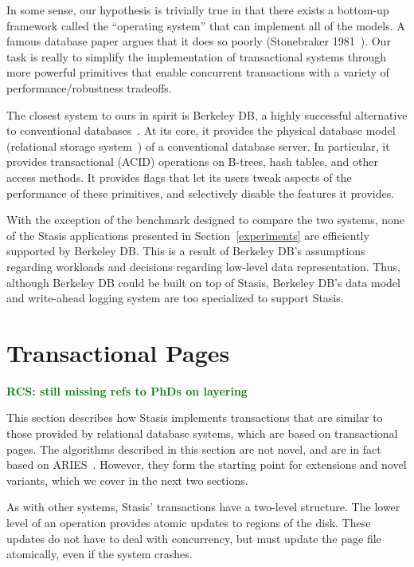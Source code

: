 \documentclass[letterpaper,twocolumn,10pt]{article}
\newcommand{\yad}{Stasis\xspace}
\newcommand{\yads}{Stasis'\xspace}
\newcommand{\rcs}[1]{\textcolor{green}{\bf RCS: #1}}
\begin{document}
In some sense, our hypothesis is trivially true in that there exists a
bottom-up framework called the ``operating system'' that can implement
all of the models. A famous database paper argues that it does so
poorly (Stonebraker 1981~\cite{Stonebraker81}). Our task is really to
simplify the implementation of transactional systems through more
powerful primitives that enable concurrent transactions with a variety
of performance/robustness tradeoffs.

The closest system to ours in spirit is Berkeley DB,  a highly successful alternative to conventional
databases~\cite{libtp}.  At its core, it provides the physical database model
(relational storage system~\cite{systemR}) of a conventional database server.
In particular, 
it provides transactional (ACID) operations on B-trees, 
hash tables, and other access methods.  It provides flags that 
let its users tweak aspects of the performance of these
primitives, and selectively disable the features it provides.

With the exception of the benchmark designed to compare the two
systems, none of the \yad applications presented in
Section~\ref{experiments} are efficiently supported by Berkeley DB.
This is a result of Berkeley DB's assumptions regarding workloads and
decisions regarding low-level data representation.  Thus, although
Berkeley DB could be built on top of \yad, Berkeley DB's data model
and write-ahead logging system are too specialized to support \yad.




\section{Transactional Pages}

\rcs{still missing refs to PhDs on layering}

This section describes how \yad implements transactions that are
similar to those provided by relational database systems, which are
based on transactional pages.  The algorithms described in this
section are not novel, and are in fact based on
ARIES~\cite{aries}.  However, they form the starting point for
extensions and novel variants, which we cover in the next two
sections.

As with other systems, \yads transactions have a two-level structure.
The lower level of an operation provides atomic updates to regions of
the disk.  These updates do not have to deal with concurrency, but
must update the page file atomically, even if the system crashes.
\end{document}
